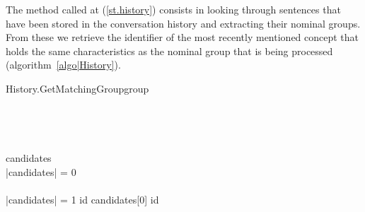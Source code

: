 \documentclass[11pt]{article}
\begin{document}
The method called at (\ref{st.history}) consists in looking through sentences 
that have been stored in the conversation history and extracting their nominal
groups. From these we retrieve the identifier of the most recently mentioned 
concept that holds the same characteristics as the nominal group that is being 
processed (algorithm~\ref{algo|History}).

\begin{pseudocode}[ruled]{History.GetMatchingGroup}{group}
\label{algo|History}
\\
 \GETS {}\\
 \\
 \\
	 \GETS {} \\ 
	
	candidates \GETS {} \cap {}\\
	\IF \left|{candidates}\right| = 0 \THEN
    \BEGIN
       \\
      \EXIT \\
    \END
   \ELSEIF \left|{candidates}\right| = 1 \THEN
      id \GETS candidates[0]
   \ELSE
   	  id \GETS {}\\
\ENDPROCEDURE
\end{pseudocode}
\end{document}
